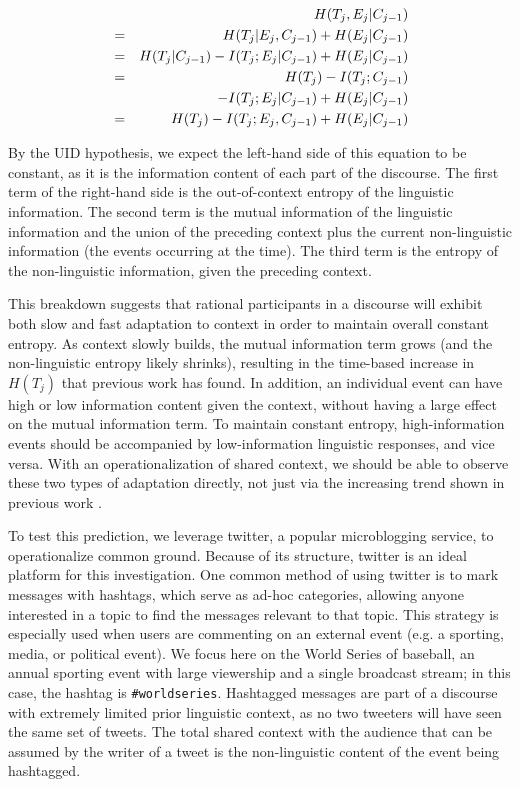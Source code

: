 \documentclass[11pt,letterpaper]{article}
\begin{document}
\begin{eqnarray}
\nonumber &&\hspace*{-2.5em}H(T_j,E_j|C_{j-1}) \\
\nonumber &=& H(T_j|E_j,C_{j-1}) + H(E_j|C_{j-1}) \\
\nonumber                    &=& H(T_j|C_{j-1}) - I(T_j;E_j|C_{j-1}) + H(E_j|C_{j-1}) \\
\nonumber                    &=& H(T_j) - I(T_j;C_{j-1}) \\
\nonumber                    && \quad - I(T_j;E_j|C_{j-1}) + H(E_j|C_{j-1}) \\
\label{eq:joint-entropy}     &=& H(T_j) - I(T_j;E_j,C_{j-1}) + H(E_j|C_{j-1})
\end{eqnarray}

By the UID hypothesis, we expect the left-hand side of this equation to be constant, as it is the information content of each part of the discourse.  The first term of the right-hand side is the out-of-context entropy of the linguistic information. The second term is the mutual information of the linguistic information and the union of the preceding context plus the current non-linguistic information (the events occurring at the time).  The third term is the entropy of the non-linguistic information, given the preceding context.

This breakdown suggests that rational participants in a discourse will exhibit both slow and fast adaptation to context in order to maintain overall constant entropy.  As context slowly builds, the mutual information term grows (and the non-linguistic entropy likely shrinks), resulting in the time-based increase in $H(T_j)$ that previous work has found.  In addition, an individual event can have high or low information content given the context, without having a large effect on the mutual information term.  To maintain constant entropy, high-information events should be accompanied by low-information linguistic responses, and vice versa.  With an operationalization of shared context, we should be able to observe these two types of adaptation directly, not just via the increasing trend shown in previous work \cite{genzel2002,qian2012}.  

To test this prediction, we leverage twitter, a popular microblogging service, to operationalize common ground. Because of its structure, twitter is an ideal platform for this investigation. One common method of using twitter is to mark messages with hashtags, which serve as ad-hoc categories, allowing anyone interested in a topic to find the messages relevant to that topic. This strategy is especially used when users are commenting on an external event (e.g. a sporting, media, or political event). We focus here on the World Series of baseball, an annual sporting event with large viewership and a single broadcast stream; in this case, the hashtag is \texttt{\#worldseries}. Hashtagged messages are part of a discourse with extremely limited prior linguistic context, as no two tweeters will have seen the same set of tweets. The total shared context with the audience that can be assumed by the writer of a tweet is the non-linguistic content of the event being hashtagged. 
\end{document}
